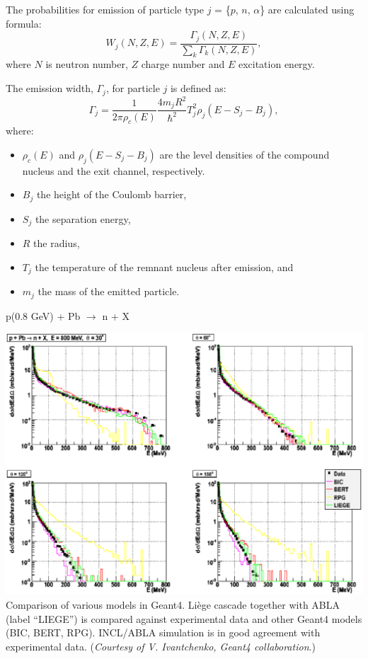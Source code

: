 \documentclass[20pt]{article}
\newenvironment{textbox}
{\begin{lrbox}{\dummybox}\begin{minipage}{0.9\columnwidth}}
{\end{minipage}\end{lrbox}\raisebox{-\depth}{\psshadowbox[framesep=1em,framearc=.1,shadow=true]{\usebox{\dummybox}}}\vspace{0.005\textheight}}
\begin{document}
\begin{center}
\begin{multicols}{3}
\begin{textbox}
{The probabilities for emission of particle type $j$ = \{$p$, $n$, $\alpha$\}
are calculated using formula:
\begin{equation}
W_j(N,Z,E) = \frac{\Gamma_j(N,Z,E)}{\sum_k\Gamma_k(N,Z,E)},
\label{eqn:probabilities}
\end{equation}
where $N$ is neutron
number, $Z$ charge number and $E$ excitation energy.
\vskip0.5cm

The emission width, $\Gamma_j$, for particle $j$ is defined as:
\begin{equation}
\Gamma_j = \frac{1}{2 \pi \rho_c(E)} \frac{4 m_j R^2}{\hbar^2} T_j^2 \rho_j(E - S_j - B_j),
\label{eqn:emissionwidth}
\end{equation}
where:
\begin{itemize}
\item $\rho_c(E)$ and $\rho_j(E - S_j - B_j)$ are the level densities
of the compound nucleus and the exit channel, respectively.
\item $B_j$ the height of the Coulomb barrier,
\item $S_j$ the separation energy,
\item $R$ the radius,
\item $T_j$ the temperature of the remnant nucleus after
emission, and
\item $m_j$ the mass of the emitted particle.
\end{itemize}
}
\end{textbox}

{\Huge {\sf p(0.8 GeV) + Pb $\rightarrow$ n + X}}

\includegraphics[scale=0.45]{images/vladimir.eps}
{\Large {\sf Comparison of various models in {\sf Geant4}. Li\`ege cascade together with ABLA (label ``LIEGE'') is compared against experimental data and other {\sf Geant4} models (BIC, BERT, RPG).
 {\sf INCL/ABLA} simulation is in good agreement with experimental data. (\emph{Courtesy of
    V. Ivantchenko, Geant4 collaboration}.)}}


\end{multicols}
\end{center}
\end{document}
